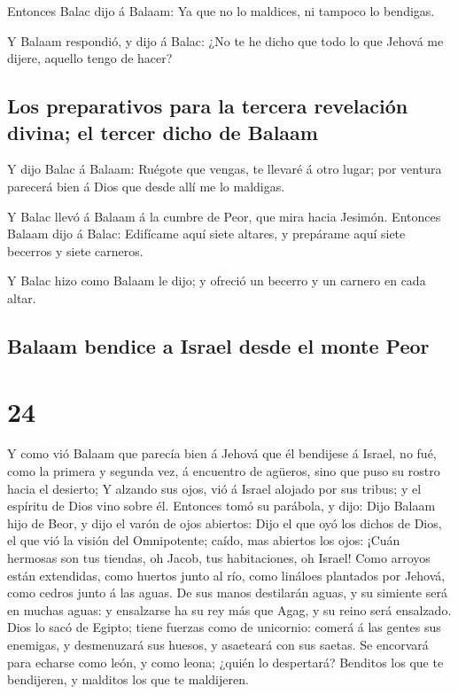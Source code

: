  Entonces Balac dijo á Balaam: Ya que no lo maldices, ni
tampoco lo bendigas.

 Y Balaam respondió, y dijo á Balac: ¿No te he dicho que
todo lo que Jehová me dijere, aquello tengo de hacer?

\hypertarget{los-preparativos-para-la-tercera-revelaciuxf3n-divina-el-tercer-dicho-de-balaam}{%
\subsection{Los preparativos para la tercera revelación divina; el
tercer dicho de
Balaam}\label{los-preparativos-para-la-tercera-revelaciuxf3n-divina-el-tercer-dicho-de-balaam}}

 Y dijo Balac á Balaam: Ruégote que vengas, te llevaré á
otro lugar; por ventura parecerá bien á Dios que desde allí me lo
maldigas.

 Y Balac llevó á Balaam á la cumbre de Peor, que mira
hacia Jesimón.  Entonces Balaam dijo á Balac: Edifícame
aquí siete altares, y prepárame aquí siete becerros y siete carneros.

 Y Balac hizo como Balaam le dijo; y ofreció un becerro y
un carnero en cada altar.

\hypertarget{balaam-bendice-a-israel-desde-el-monte-peor}{%
\subsection{Balaam bendice a Israel desde el monte
Peor}\label{balaam-bendice-a-israel-desde-el-monte-peor}}

\hypertarget{section-04-24}{%
\section{24}\label{section-04-24}}

 Y como vió Balaam que parecía bien á Jehová que él
bendijese á Israel, no fué, como la primera y segunda vez, á encuentro
de agüeros, sino que puso su rostro hacia el desierto;  Y
alzando sus ojos, vió á Israel alojado por sus tribus; y el espíritu de
Dios vino sobre él.  Entonces tomó su parábola, y dijo:
Dijo Balaam hijo de Beor, y dijo el varón de ojos abiertos:
 Dijo el que oyó los dichos de Dios, el que vió la visión
del Omnipotente; caído, mas abiertos los ojos:  ¡Cuán
hermosas son tus tiendas, oh Jacob, tus habitaciones, oh Israel!
 Como arroyos están extendidas, como huertos junto al río,
como lináloes plantados por Jehová, como cedros junto á las aguas.
 De sus manos destilarán aguas, y su simiente será en
muchas aguas: y ensalzarse ha su rey más que Agag, y su reino será
ensalzado.  Dios lo sacó de Egipto; tiene fuerzas como de
unicornio: comerá á las gentes sus enemigas, y desmenuzará sus huesos, y
asaeteará con sus saetas.  Se encorvará para echarse como
león, y como leona; ¿quién lo despertará? Benditos los que te
bendijeren, y malditos los que te maldijeren.


